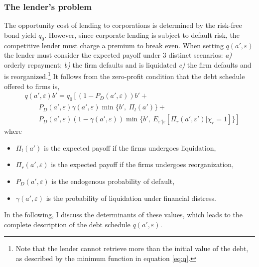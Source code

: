 \documentclass[12pt]{article}
\begin{document}
\subsubsection{The lender's problem}    \label{sec: The lender's problem}
The opportunity cost of lending to corporations is determined by the risk-free bond yield $q_0$. However, since corporate lending is subject to default risk, the competitive lender must charge a premium to break even. When setting $q(a',\varepsilon)$ the lender must consider the expected payoff under 3 distinct scenarios: \textit{a)} orderly repayment; \textit{b)} the firm defaults and is liquidated \textit{c)} the firm defaults and is reorganized.\footnote{Note that the lender cannot retrieve more than the initial value of the debt, as described by the minimum function in equation \ref{eq:q}.}  It follows from the zero-profit condition that the debt schedule offered to firms is, 
\begin{equation} \label{eq:q}
    \begin{split}
        & q(a', \varepsilon)b' = q_0 \left[ \left(1-P_D(a', \varepsilon)\right)b' + \right. \\
        & \qquad P_D(a', \varepsilon) \gamma(a', \varepsilon) \min \{b', \ \Pi_{l}(a')\} + \\ 
        & \qquad \left. P_D(a', \varepsilon) (1-\gamma(a', \varepsilon))\min \{b', \ E_{\varepsilon' | \varepsilon} [ \Pi_{r}(a', \varepsilon') |\chi_r = 1 ] \} \right]
    \end{split}
\end{equation}
where 
\begin{itemize}\setlength\itemsep{0em} 
    \item $\Pi_{l}(a')$ is the expected payoff if the firms undergoes liquidation,
    \item $\Pi_{r}(a', \varepsilon)$ is the expected payoff if the firms undergoes reorganization,
    \item $P_D(a', \varepsilon)$ is the endogenous probability of default,
    \item $\gamma(a', \varepsilon)$ is the probability of liquidation under financial distress. 
\end{itemize} 
In the following, I discuss the determinants of these values, which leads to the complete description of the debt schedule $q(a', \varepsilon)$.
 
\end{document}
